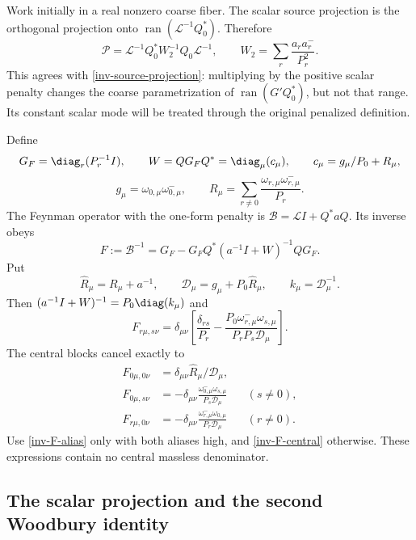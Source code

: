 Work initially in a real nonzero coarse fiber. The scalar source
projection is the orthogonal projection onto
$\operatorname{ran}(\mathcal L^{-1}Q_0^*)$. Therefore
\begin{equation}\label{inv-projection-alias}
 \mathcal P=\mathcal L^{-1}Q_0^*W_2^{-1}Q_0\mathcal L^{-1},
 \qquad W_2=\sum_r\frac{a_ra_r^-}{P_r^2}.
\end{equation}
This agrees with \eqref{inv-source-projection}: multiplying by the
positive scalar penalty changes the coarse parametrization of
$\operatorname{ran}(G'Q_0^*)$, but not that range. Its constant scalar
mode will be treated through the original penalized definition.

Define
\[
 G_F=\diag_r(P_r^{-1}I),\qquad
 W=QG_FQ^*=\diag_\mu(c_\mu),\qquad
 c_\mu=g_\mu/P_0+R_\mu,
\]
\[
 g_\mu=\omega_{0,\mu}\omega_{0,\mu}^-,\qquad
 R_\mu=\sum_{r\ne0}\frac{\omega_{r,\mu}\omega_{r,\mu}^-}{P_r}.
\]
The Feynman operator with the one-form penalty is
$\mathcal B=\mathcal L I+Q^*aQ$. Its inverse obeys
\begin{equation}\label{inv-F-woodbury}
 F:=\mathcal B^{-1}
 =G_F-G_FQ^*(a^{-1}I+W)^{-1}QG_F.
\end{equation}
Put
\begin{equation}\label{inv-Da}
 \widehat R_\mu=R_\mu+a^{-1},\qquad
 \mathcal D_\mu=g_\mu+P_0\widehat R_\mu,\qquad
 k_\mu=\mathcal D_\mu^{-1}.
\end{equation}
Then $(a^{-1}I+W)^{-1}=P_0\diag(k_\mu)$ and
\begin{equation}\label{inv-F-alias}
 F_{r\mu,s\nu}=\delta_{\mu\nu}
 \left[\frac{\delta_{rs}}{P_r}
 -\frac{P_0\omega_{r,\mu}^-\omega_{s,\mu}}
              {P_rP_s\mathcal D_\mu}\right].
\end{equation}
The central blocks cancel exactly to
\begin{align}
 F_{0\mu,0\nu}
 &=\delta_{\mu\nu}\widehat R_\mu/\mathcal D_\mu,
 \label{inv-F-central}\\
 F_{0\mu,s\nu}
 &=-\delta_{\mu\nu}
   \frac{\omega_{0,\mu}^-\omega_{s,\mu}}{P_s\mathcal D_\mu}
       &&(s\ne0),\nonumber\\
 F_{r\mu,0\nu}
 &=-\delta_{\mu\nu}
   \frac{\omega_{r,\mu}^-\omega_{0,\mu}}{P_r\mathcal D_\mu}
       &&(r\ne0).\nonumber
\end{align}
Use \eqref{inv-F-alias} only with both aliases high, and
\eqref{inv-F-central} otherwise. These expressions contain no
central massless denominator.

\subsection{The scalar projection and the second Woodbury identity}

